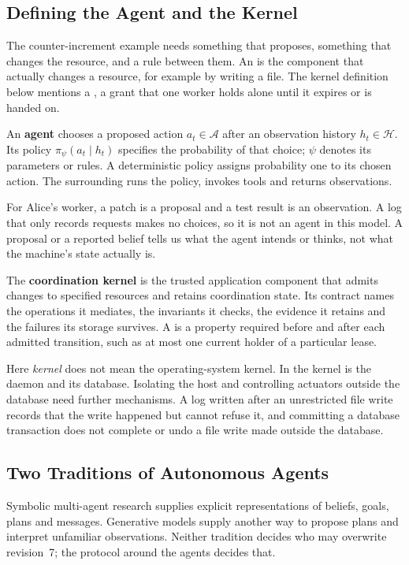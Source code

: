 \subsection{Defining the Agent and the Kernel}
The counter-increment example needs something that proposes, something that changes the
resource, and a rule between them. An  is the component that
actually changes a resource, for example by writing a file. The kernel
definition below mentions a , a grant that one worker holds alone
until it expires or is handed on.

\begin{definition}\label{def:agent}
An \textbf{agent} chooses a proposed action $a_t\in\mathcal A$ after an
observation history $h_t\in\mathcal H$. Its policy
$\pi_\psi(a_t\mid h_t)$ specifies the probability of that choice;
$\psi$ denotes its parameters or rules. A deterministic policy assigns
probability one to its chosen action. The surrounding  runs the
policy, invokes tools and returns observations.
\end{definition}
For Alice's worker, a patch is a proposal and a test result is an observation.
A log that only records requests makes no choices, so it is not an agent in
this model. A proposal or a reported belief tells us what the agent intends or
thinks, not what the machine's state actually is.

\begin{definition}\label{def:kernel}
The \textbf{coordination kernel} is the trusted application component that
admits changes to specified resources and retains coordination state. Its
contract names the operations it mediates, the invariants it checks, the
evidence it retains and the failures its storage survives. A 
is a property required before and after each admitted transition, such as
at most one current holder of a particular lease.
\end{definition}
Here \emph{kernel} does not mean the operating-system kernel. In  the
kernel is the daemon and its database. Isolating the host and controlling
actuators outside the database need further mechanisms. A log written after an
unrestricted file write records that the write happened but cannot refuse it,
and committing a database transaction does not complete or undo a file write
made outside the database.

\subsection{Two Traditions of Autonomous Agents}\label{sec:prereq-lineage}
Symbolic multi-agent research supplies explicit representations of beliefs,
goals, plans and messages. Generative models supply another way to propose
plans and interpret unfamiliar observations. Neither tradition decides who may
overwrite revision~7; the protocol around the agents decides that.


